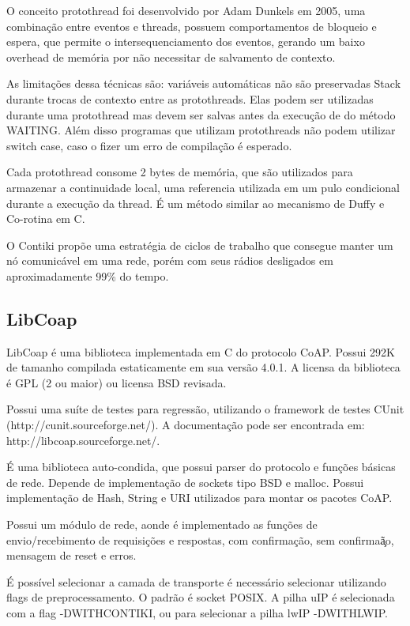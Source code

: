 O conceito protothread foi desenvolvido por Adam Dunkels em 2005, uma combina\c{c}\~ao entre eventos e threads, possuem comportamentos de bloqueio e espera, que permite o intersequenciamento dos eventos, gerando um baixo overhead de mem\'oria por n\~ao necessitar de salvamento de contexto.

As limita\c{c}\~oes dessa t\'ecnicas s\~ao: vari\'aveis autom\'aticas n\~ao s\~ao preservadas Stack durante trocas de contexto entre as protothreads. Elas podem ser utilizadas durante uma protothread mas devem ser salvas antes da execu\c{c}\~ao de do m\'etodo WAITING. Al\'em disso programas que utilizam protothreads n\~ao podem utilizar switch case, caso o fizer um erro de compila\c{c}\~ao \'e esperado.

Cada protothread consome 2 bytes de mem\'oria, que s\~ao utilizados para armazenar a continuidade local, uma referencia utilizada em um pulo condicional durante a execu\c{c}\~ao da thread. \'E um m\'etodo similar ao mecanismo de Duffy e Co-rotina em C. \cite{duffyMechanism}

O Contiki prop\~oe uma estrat\'egia de ciclos de trabalho que consegue manter um n\'o comunic\'avel em uma rede, por\'em com seus r\'adios desligados em aproximadamente 99\% do tempo.\cite{Dunkels11thecontikimac}

\subsection{LibCoap}
LibCoap \'e uma biblioteca implementada em C do protocolo CoAP. Possui 292K de tamanho compilada estaticamente em sua vers\~ao 4.0.1.
A licensa da biblioteca \'e GPL (2 ou maior) ou licensa BSD revisada.

Possui uma su\'ite de testes para regress\~ao, utilizando o framework de testes CUnit (http://cunit.sourceforge.net/). A documenta\c{c}\~ao pode ser encontrada em: http://libcoap.sourceforge.net/.

\'E uma biblioteca auto-condida, que possui parser do protocolo e fun\c{c}\~oes b\'asicas de rede. Depende de implementa\c{c}\~ao de sockets tipo BSD e malloc. Possui implementa\c{c}\~ao de Hash, String e URI utilizados para montar os pacotes CoAP.

Possui um m\'odulo de rede, aonde \'e implementado as fun\c{c}\~oes de envio/recebimento de requisi\c{c}\~oes e respostas, com confirma\c{c}\~ao, sem confirma\c\~ao, mensagem de reset e erros.

\'E poss\'ivel selecionar a camada de transporte \'e necess\'ario selecionar utilizando flags de preprocessamento. O padr\~ao \'e socket POSIX. A pilha uIP \'e selecionada com a flag -DWITH\textunderscore CONTIKI, ou para selecionar a pilha lwIP -DWITH\textunderscore LWIP.


